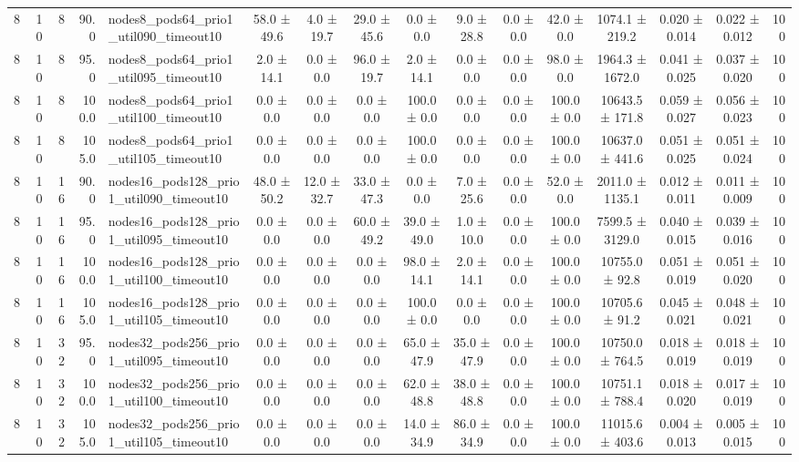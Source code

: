 \begin{tabular}{r r r r l c c c c c c c c c c r}
8 & 10 & 8 & 90.0 & nodes8\_pods64\_prio1\_util090\_timeout10 & 58.0 ± 49.6 & 4.0 ± 19.7 & 29.0 ± 45.6 & 0.0 ± 0.0 & 9.0 ± 28.8 & 0.0 ± 0.0 & 42.0 ± 0.0 & 1074.1 ± 219.2 & 0.020 ± 0.014 & 0.022 ± 0.012 & 100 \\
8 & 10 & 8 & 95.0 & nodes8\_pods64\_prio1\_util095\_timeout10 & 2.0 ± 14.1 & 0.0 ± 0.0 & 96.0 ± 19.7 & 2.0 ± 14.1 & 0.0 ± 0.0 & 0.0 ± 0.0 & 98.0 ± 0.0 & 1964.3 ± 1672.0 & 0.041 ± 0.025 & 0.037 ± 0.020 & 100 \\
8 & 10 & 8 & 100.0 & nodes8\_pods64\_prio1\_util100\_timeout10 & 0.0 ± 0.0 & 0.0 ± 0.0 & 0.0 ± 0.0 & 100.0 ± 0.0 & 0.0 ± 0.0 & 0.0 ± 0.0 & 100.0 ± 0.0 & 10643.5 ± 171.8 & 0.059 ± 0.027 & 0.056 ± 0.023 & 100 \\
8 & 10 & 8 & 105.0 & nodes8\_pods64\_prio1\_util105\_timeout10 & 0.0 ± 0.0 & 0.0 ± 0.0 & 0.0 ± 0.0 & 100.0 ± 0.0 & 0.0 ± 0.0 & 0.0 ± 0.0 & 100.0 ± 0.0 & 10637.0 ± 441.6 & 0.051 ± 0.025 & 0.051 ± 0.024 & 100 \\
8 & 10 & 16 & 90.0 & nodes16\_pods128\_prio1\_util090\_timeout10 & 48.0 ± 50.2 & 12.0 ± 32.7 & 33.0 ± 47.3 & 0.0 ± 0.0 & 7.0 ± 25.6 & 0.0 ± 0.0 & 52.0 ± 0.0 & 2011.0 ± 1135.1 & 0.012 ± 0.011 & 0.011 ± 0.009 & 100 \\
8 & 10 & 16 & 95.0 & nodes16\_pods128\_prio1\_util095\_timeout10 & 0.0 ± 0.0 & 0.0 ± 0.0 & 60.0 ± 49.2 & 39.0 ± 49.0 & 1.0 ± 10.0 & 0.0 ± 0.0 & 100.0 ± 0.0 & 7599.5 ± 3129.0 & 0.040 ± 0.015 & 0.039 ± 0.016 & 100 \\
8 & 10 & 16 & 100.0 & nodes16\_pods128\_prio1\_util100\_timeout10 & 0.0 ± 0.0 & 0.0 ± 0.0 & 0.0 ± 0.0 & 98.0 ± 14.1 & 2.0 ± 14.1 & 0.0 ± 0.0 & 100.0 ± 0.0 & 10755.0 ± 92.8 & 0.051 ± 0.019 & 0.051 ± 0.020 & 100 \\
8 & 10 & 16 & 105.0 & nodes16\_pods128\_prio1\_util105\_timeout10 & 0.0 ± 0.0 & 0.0 ± 0.0 & 0.0 ± 0.0 & 100.0 ± 0.0 & 0.0 ± 0.0 & 0.0 ± 0.0 & 100.0 ± 0.0 & 10705.6 ± 91.2 & 0.045 ± 0.021 & 0.048 ± 0.021 & 100 \\
8 & 10 & 32 & 95.0 & nodes32\_pods256\_prio1\_util095\_timeout10 & 0.0 ± 0.0 & 0.0 ± 0.0 & 0.0 ± 0.0 & 65.0 ± 47.9 & 35.0 ± 47.9 & 0.0 ± 0.0 & 100.0 ± 0.0 & 10750.0 ± 764.5 & 0.018 ± 0.019 & 0.018 ± 0.019 & 100 \\
8 & 10 & 32 & 100.0 & nodes32\_pods256\_prio1\_util100\_timeout10 & 0.0 ± 0.0 & 0.0 ± 0.0 & 0.0 ± 0.0 & 62.0 ± 48.8 & 38.0 ± 48.8 & 0.0 ± 0.0 & 100.0 ± 0.0 & 10751.1 ± 788.4 & 0.018 ± 0.020 & 0.017 ± 0.019 & 100 \\
8 & 10 & 32 & 105.0 & nodes32\_pods256\_prio1\_util105\_timeout10 & 0.0 ± 0.0 & 0.0 ± 0.0 & 0.0 ± 0.0 & 14.0 ± 34.9 & 86.0 ± 34.9 & 0.0 ± 0.0 & 100.0 ± 0.0 & 11015.6 ± 403.6 & 0.004 ± 0.013 & 0.005 ± 0.015 & 100 \\

\end{tabular}
